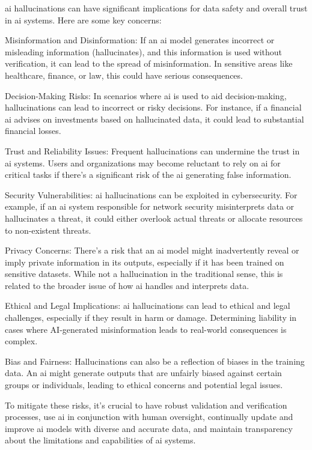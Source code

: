 \begin{aibox}%
  \Gls{ai} hallucinations can have significant implications for data safety and overall trust in \gls{ai} systems. Here are some key concerns:

Misinformation and Disinformation: If an \gls{ai} model generates incorrect or misleading \gls{information} (hallucinates), and this \gls{information} is used without verification, it can lead to the spread of misinformation. In sensitive areas like healthcare, finance, or law, this could have serious consequences.

Decision-Making Risks: In scenarios where \gls{ai} is used to aid decision-making, hallucinations can lead to incorrect or risky decisions. For instance, if a financial \gls{ai} advises on investments based on hallucinated data, it could lead to substantial financial losses.

Trust and Reliability Issues: Frequent hallucinations can undermine the trust in \gls{ai} systems. Users and organizations may become reluctant to rely on \gls{ai} for critical tasks if there's a significant risk of the \gls{ai} generating false \gls{information}.

Security Vulnerabilities: \gls{ai} hallucinations can be exploited in cybersecurity. For example, if an \gls{ai} system responsible for network security misinterprets data or hallucinates a threat, it could either overlook actual threats or allocate resources to non-existent threats.

Privacy Concerns: There’s a risk that an \gls{ai} model might inadvertently reveal or imply private \gls{information} in its outputs, especially if it has been trained on sensitive \glspl{dataset}. While not a hallucination in the traditional sense, this is related to the broader issue of how \gls{ai} handles and interprets data.

Ethical and Legal Implications: \gls{ai} hallucinations can lead to ethical and legal challenges, especially if they result in harm or damage. Determining liability in cases where AI-generated misinformation leads to real-world consequences is complex.

Bias and Fairness: Hallucinations can also be a reflection of biases in the training data. An \gls{ai} might generate outputs that are unfairly biased against certain groups or individuals, leading to ethical concerns and potential legal issues.

To mitigate these risks, it's crucial to have robust validation and verification processes, use \gls{ai} in conjunction with human oversight, continually update and improve \gls{ai} models with diverse and accurate data, and maintain transparency about the limitations and capabilities of \gls{ai} systems.
\end{aibox}

